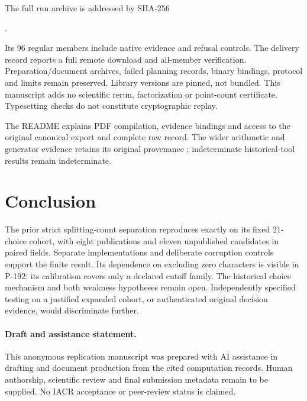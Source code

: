 \documentclass[11pt]{article}
\begin{document}
The full run archive is addressed by SHA-256
\begin{center}\small
{}.
\end{center}
Its 96 regular members include native evidence and refusal controls.
The delivery record reports a full remote download and all-member
verification. Preparation/document archives, failed planning records,
binary bindings, protocol and limits remain preserved. Library
versions are pinned, not bundled. This manuscript adds no scientific
rerun, factorization or point-count certificate. Typesetting checks do
not constitute cryptographic replay.

The README explains PDF compilation, evidence bindings and access to
the original canonical export and complete raw record. The wider
arithmetic and generator evidence retains its original provenance
\cite{generatordata,factordata}; indeterminate historical-tool results
remain indeterminate.

\section{Conclusion}
The prior strict splitting-count separation reproduces exactly on its
fixed 21-choice cohort, with eight publications and eleven unpublished
candidates in paired fields. Separate implementations and deliberate
corruption controls support the finite result. Its dependence on
excluding zero characters is visible in P-192; its calibration covers
only a declared cutoff family. The historical choice mechanism and
both weakness hypotheses remain open. Independently specified testing
on a justified expanded cohort, or authenticated original decision
evidence, would discriminate further.

\paragraph{Draft and assistance statement.}
This anonymous replication manuscript was prepared with AI assistance
in drafting and document production from the cited computation records.
Human authorship, scientific review and final submission metadata
remain to be supplied. No IACR acceptance or peer-review status is claimed.

\appendix
\end{document}
